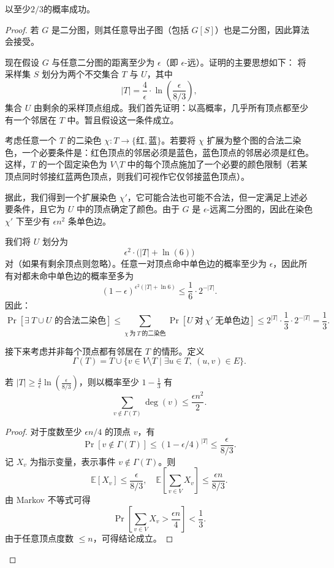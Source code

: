 \begin{theorem}
以至少$2/3$的概率成功。
\end{theorem}
\begin{proof}
若 $G$ 是二分图，则其任意导出子图（包括 $G[S]$）也是二分图，因此算法会接受。

现在假设 $G$ 与任意二分图的距离至少为 $\epsilon$（即 $\epsilon$-远）。证明的主要思想如下：  
将采样集 $S$ 划分为两个不交集合 $T$ 与 $U$，其中  
$$
|T| = \frac{4}{\epsilon} \cdot \ln\!\left( \frac{\epsilon}{8/3} \right),
$$
集合 $U$ 由剩余的采样顶点组成。我们首先证明：以高概率，几乎所有顶点都至少有一个邻居在 $T$ 中。暂且假设这一条件成立。

考虑任意一个 $T$ 的二染色 $\chi : T \to \{\text{红}, \text{蓝}\}$。若要将 $\chi$ 扩展为整个图的合法二染色，一个必要条件是：红色顶点的邻居必须是蓝色，蓝色顶点的邻居必须是红色。这样，$T$ 的一个固定染色为 $V \setminus T$ 中的每个顶点施加了一个必要的颜色限制（若某顶点同时邻接红蓝两色顶点，则我们可视作它仅邻接蓝色顶点）。

据此，我们得到一个扩展染色 $\chi'$，它可能合法也可能不合法，但一定满足上述必要条件，且它为 $U$ 中的顶点确定了颜色。由于 $G$ 是 $\epsilon$-远离二分图的，因此在染色 $\chi'$ 下至少有 $\epsilon n^2$ 条单色边。

我们将 $U$ 划分为
$$
\epsilon^2 \cdot \big(|T| + \ln(6)\big)
$$
对（如果有剩余顶点则忽略）。任意一对顶点命中单色边的概率至少为 $\epsilon$，因此所有对都未命中单色边的概率至多为
$$
(1 - \epsilon)^{\epsilon^2 (|T| + \ln 6)} \le \frac{1}{6} \cdot 2^{-|T|}.
$$
因此：
$$
\Pr[\exists\ \text{$T \cup U$ 的合法二染色}] \le
\sum_{\chi \ \text{为}\ T\ \text{的二染色}} \Pr[U\ \text{对}\ \chi' \ \text{无单色边}]
\le 2^{|T|} \cdot \frac{1}{3} \cdot 2^{-|T|} = \frac{1}{3}.
$$

接下来考虑并非每个顶点都有邻居在 $T$ 的情形。定义
$$
\Gamma(T) = T \cup \{ v \in V \setminus T \mid \exists u \in T,\ (u,v) \in E \}.
$$

\begin{claim}
若 $|T| \ge \frac{4}{\epsilon} \ln\!\left( \frac{\epsilon}{8/3} \right)$，则以概率至少 $1 - \frac13$ 有
$$
\sum_{v \notin \Gamma(T)} \deg(v) \le \frac{\epsilon n^2}{2}.
$$
\end{claim}

\begin{proof}
对于度数至少 $\epsilon n/4$ 的顶点 $v$，有
$$
\Pr[v \notin \Gamma(T)] \le (1 - \epsilon/4)^{|T|} \le \frac{\epsilon}{8/3}.
$$
记 $X_v$ 为指示变量，表示事件 $v \notin \Gamma(T)$。则
$$
\mathbb{E}[X_v] \le \frac{\epsilon}{8/3}, \quad
\mathbb{E}\left[ \sum_{v \in V} X_v \right] \le \frac{\epsilon n}{8/3}.
$$
由 Markov 不等式可得
$$
\Pr\left[ \sum_{v \in V} X_v > \frac{\epsilon n}{4} \right] < \frac13.
$$
由于任意顶点度数 $\le n$，可得结论成立。
\end{proof}



\end{proof}
